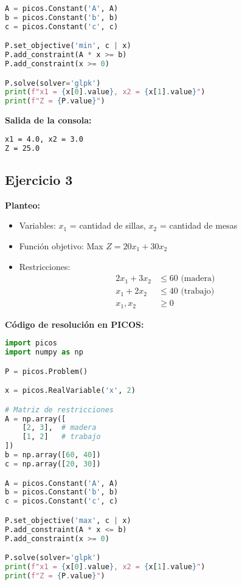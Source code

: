 \documentclass[12pt]{article}
\begin{document}
\begin{enumerate}
\begin{lstlisting}[language=Python]
A = picos.Constant('A', A)
b = picos.Constant('b', b)
c = picos.Constant('c', c)

P.set_objective('min', c | x)
P.add_constraint(A * x >= b)
P.add_constraint(x >= 0)

P.solve(solver='glpk')
print(f"x1 = {x[0].value}, x2 = {x[1].value}")
print(f"Z = {P.value}")
\end{lstlisting}

\textbf{Salida de la consola:}
\begin{lstlisting}[language=bash,backgroundcolor=\color{black},basicstyle=\color{white}\ttfamily,numbers=none]
x1 = 4.0, x2 = 3.0
Z = 25.0
\end{lstlisting}

\subsection*{Ejercicio 3}

\textbf{Planteo:}
\begin{itemize}
\item Variables: $x_1$ = cantidad de sillas, $x_2$ = cantidad de mesas
\item Función objetivo: Max $Z = 20x_1 + 30x_2$
\item Restricciones:
  \begin{align*}
  2x_1 + 3x_2 &\leq 60 \text{ (madera)} \\
  x_1 + 2x_2 &\leq 40 \text{ (trabajo)} \\
  x_1, x_2 &\geq 0
  \end{align*}
\end{itemize}

\textbf{Código de resolución en PICOS:}
\begin{lstlisting}[language=Python]
import picos
import numpy as np

P = picos.Problem()

x = picos.RealVariable('x', 2)

# Matriz de restricciones
A = np.array([
    [2, 3],  # madera
    [1, 2]   # trabajo
])
b = np.array([60, 40])
c = np.array([20, 30])

A = picos.Constant('A', A)
b = picos.Constant('b', b)
c = picos.Constant('c', c)

P.set_objective('max', c | x)
P.add_constraint(A * x <= b)
P.add_constraint(x >= 0)

P.solve(solver='glpk')
print(f"x1 = {x[0].value}, x2 = {x[1].value}")
print(f"Z = {P.value}")
\end{lstlisting}


\end{enumerate}
\end{document}

